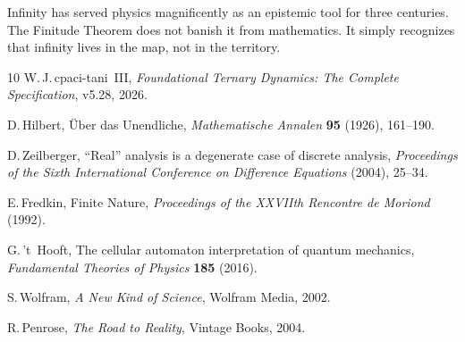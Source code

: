 \documentclass[11pt]{article}
\theoremstyle{tight}
\theoremstyle{plainroman}
\begin{document}
Infinity has served physics magnificently as an epistemic tool for three centuries.
The Finitude Theorem does not banish it from mathematics.
It simply recognizes that infinity lives in the map, not in the territory.

\begin{thebibliography}{10}
W.\,J.\,cpaci-tani~III,
\emph{Foundational Ternary Dynamics: The Complete Specification}, v5.28, 2026.

D.\,Hilbert,
\"Uber das Unendliche,
\emph{Mathematische Annalen} \textbf{95} (1926), 161--190.

D.\,Zeilberger,
``Real'' analysis is a degenerate case of discrete analysis,
\emph{Proceedings of the Sixth International Conference on Difference Equations} (2004), 25--34.

E.\,Fredkin,
Finite Nature,
\emph{Proceedings of the XXVIIth Rencontre de Moriond} (1992).

G.\,'t~Hooft,
The cellular automaton interpretation of quantum mechanics,
\emph{Fundamental Theories of Physics} \textbf{185} (2016).

S.\,Wolfram,
\emph{A New Kind of Science},
Wolfram Media, 2002.

R.\,Penrose,
\emph{The Road to Reality},
Vintage Books, 2004.
\end{thebibliography}
\end{document}

